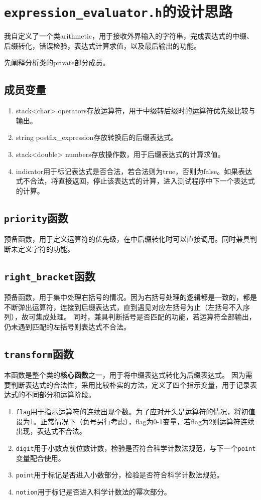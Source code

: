 \documentclass[UTF8]{ctexart}
\begin{document}
\pagestyle{fancy}
\fancyhead{}
\rhead{\today}

\setlength{\parindent}{2em}

\section{\texttt{expression\_evaluator.h}的设计思路}

我自定义了一个类arithmetic，用于接收外界输入的字符串，完成表达式的中缀、后缀转化，错误检验，表达式计算求值，以及最后输出的功能。

先阐释分析类的private部分成员。
\subsection{成员变量}
\begin{enumerate}
\item stack<char> operators存放运算符，用于中缀转后缀时的运算符优先级比较与输出。
\item string postfix\_expression存放转换后的后缀表达式。
\item stack<double> numbers存放操作数，用于后缀表达式的计算求值。
\item indicator用于标记表达式是否合法，若合法则为true，否则为false。如果表达式不合法，将直接返回，停止该表达式的计算，进入测试程序中下一个表达式的计算。
\end{enumerate}
\subsection{\texttt{priority}函数}
预备函数，用于定义运算符的优先级，在中后缀转化时可以直接调用。同时兼具判断未定义字符的功能。
\subsection{\texttt{right\_bracket}函数}
预备函数，用于集中处理右括号的情况。因为右括号处理的逻辑都是一致的，都是不断弹出运算符，连接到后缀表达式，直到遇见对应左括号为止（左括号不入序列），故可集成处理。
同时，兼具判断括号是否匹配的功能，若运算符全部输出，仍未遇到匹配的左括号则表达式不合法。
\subsection{\texttt{transform}函数}
本函数是整个类的\textbf{核心函数}之一，用于将中缀表达式转化为后缀表达式。
因为需要判断表达式的合法性，采用比较朴实的方法，定义了四个指示变量，用于记录表达式的不同部分和运算阶段。
\begin{enumerate}
\item \texttt{flag}用于指示运算符的连续出现个数。为了应对开头是运算符的情况，将初值设为1。正常情况下（负号另行考虑），flag为0-1变量，若flag为2则运算符连续出现，表达式不合法。
\item \texttt{digit}用于小数点前位数计数，检验是否符合科学计数法规范，与下一个\texttt{point}变量配合使用。
\item \texttt{point}用于标记是否进入小数部分，检验是否符合科学计数法规范。
\item \texttt{notion}用于标记是否进入科学计数法的幂次部分。
\end{enumerate}
\end{document}
